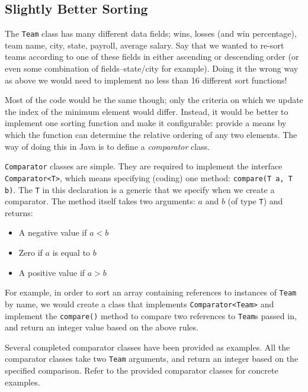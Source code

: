 \documentclass[12pt]{scrartcl}
\begin{document}
\subsection{Slightly Better Sorting}

The \texttt{Team} class has many different data fields; 
wins, losses (and win percentage), team name, city, state, payroll, 
average salary.  Say that we wanted to re-sort teams according to 
one of these fields in either ascending or descending order (or even 
some combination of fields--state/city for example).  Doing it the 
wrong way as above we would need to implement no less than 
16 different sort functions!

Most of the code would be the same though; only the criteria on 
which we update the index of the minimum element would differ.  
Instead, it would be better to implement one sorting function and 
make it configurable: provide a means by which the function can 
determine the relative ordering of any two elements.  The way of 
doing this in Java is to define a \emph{comparator} class.

\texttt{Comparator} classes are simple.  They are required 
to implement the interface \texttt{Comparator<T>}, which 
means specifying (coding) one method: \texttt{compare(T a, T b)}.  
The \texttt{T} in this declaration is a generic that we specify 
when we create a comparator.  The method itself takes two arguments: 
$a$ and $b$ (of type \texttt{T}) and returns:
\begin{itemize}
  \item A negative value if $a < b$ 
  \item Zero if $a$ is equal to $b$
  \item A positive value if $a > b$
\end{itemize}

For example, in order to sort an array containing references to 
instances of \texttt{Team} by name, we would create 
a class that implements \texttt{Comparator<Team>} and 
implement the \texttt{compare()} method to compare two 
references to \texttt{Team}s passed in, and return an 
integer value based on the above rules.

Several completed comparator classes have been provided as 
examples.  All the comparator classes take two \texttt{Team} 
arguments, and return an integer based on the specified comparison.  
Refer to the provided comparator classes for concrete examples.  
\end{document}
